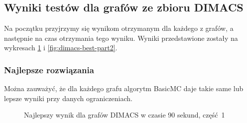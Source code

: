 \documentclass[12pt, a4paper]{article}
\begin{document}
\subsection{Wyniki testów dla grafów ze zbioru DIMACS}
Na początku przyjrzymy się wynikom otrzymanym dla każdego z grafów, a następnie na czas otrzymania tego wyniku. Wyniki przedstawione zostały na wykresach \ref{fig:dimacs-best-part1} i \ref{fig:dimacs-best-part2}. 

\subsubsection{Najlepsze rozwiązania}
Można zauważyć, że dla każdego grafu algorytm BasicMC daje takie same lub lepsze wyniki przy danych ograniczeniach.

\begin{figure}[H]
  \begin{center}
  \end{center}
  \caption{Najlepszy wynik dla grafów DIMACS w czasie 90 sekund, część 1}
  \label{fig:dimacs-best-part1}
\end{figure}
\end{document}
